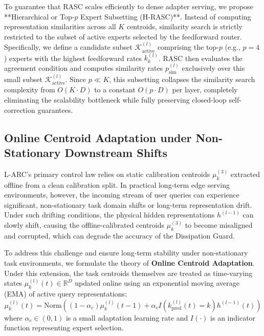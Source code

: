 To guarantee that RASC scales efficiently to dense adapter serving, we propose **Hierarchical or Top-$p$ Expert Subsetting (H-RASC)**. Instead of computing representation similarities across all $K$ centroids, similarity search is strictly restricted to the subset of active experts selected by the feedforward router. Specifically, we define a candidate subset $\mathcal{K}_{\text{active}}^{(l)}$ comprising the top-$p$ (e.g., $p = 4$) experts with the highest feedforward rates $k_k^{(l)}$. RASC then evaluates the agreement condition and computes similarity rates $p_{\text{sim}}^{(l)}$ exclusively over this small subset $\mathcal{K}_{\text{active}}^{(l)}$. Since $p \ll K$, this subsetting collapses the similarity search complexity from $O(K \cdot D)$ to a constant $O(p \cdot D)$ per layer, completely eliminating the scalability bottleneck while fully preserving closed-loop self-correction guarantees.

\subsection{Online Centroid Adaptation under Non-Stationary Downstream Shifts}
\label{sec:online_centroid_adaptation}
L-ARC's primary control law relies on static calibration centroids $\mu_k^{(3)}$ extracted offline from a clean calibration split. In practical long-term edge serving environments, however, the incoming stream of user queries can experience significant, non-stationary task domain shifts or long-term representation drift. Under such drifting conditions, the physical hidden representations $h^{(l-1)}$ can slowly shift, causing the offline-calibrated centroids $\mu_k^{(3)}$ to become misaligned and corrupted, which can degrade the accuracy of the Dissipation Guard.

To address this challenge and ensure long-term stability under non-stationary task environments, we formulate the theory of \textbf{Online Centroid Adaptation}. Under this extension, the task centroids themselves are treated as time-varying states $\mu_k^{(l)}(t) \in \mathbb{R}^D$ updated online using an exponential moving average (EMA) of active query representations:
\begin{equation}
\mu_k^{(l)}(t) = \text{Norm}\left( (1 - \alpha_c) \mu_k^{(l)}(t-1) + \alpha_c I\left(k_{\text{pred}}^{(l)}(t) = k\right) h^{(l-1)}(t) \right)
\label{eq:online_centroid_update}
\end{equation}
where $\alpha_c \in (0, 1)$ is a small adaptation learning rate and $I(\cdot)$ is an indicator function representing expert selection. 

